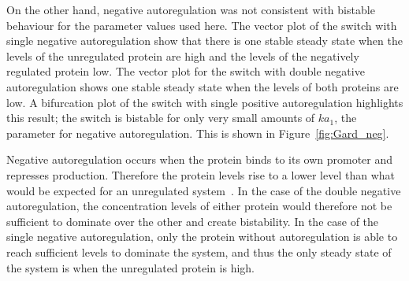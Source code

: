 
On the other hand, negative autoregulation was not consistent with bistable behaviour for the parameter values used here. The vector plot of the switch with single negative autoregulation show that there is one stable steady state when the levels of the unregulated protein are high and the levels of the negatively regulated protein low. The vector plot for the switch with double negative autoregulation shows one stable steady state when the levels of both proteins are low. A bifurcation plot of the switch with single positive autoregulation highlights this result; the switch is bistable for only very small amounts of $ka_1$, the parameter for negative autoregulation. This is shown in Figure~\ref{fig:Gard_neg}.

Negative autoregulation occurs when the protein binds to its own promoter and represses production. Therefore the protein levels rise to a lower level than what would be expected for an unregulated system~\autocite{Alon:2007}. In the case of the double negative autoregulation, the concentration levels of either protein would therefore not be sufficient to dominate over the other and create bistability. In the case of the single negative autoregulation, only the protein without autoregulation is able to reach sufficient levels to dominate the system, and thus the only steady state of the system is when the unregulated protein is high.


